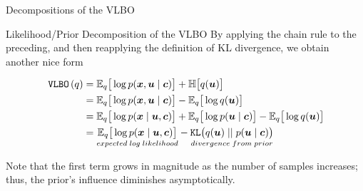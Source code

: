 \documentclass[10pt]{beamer}
\begin{document}
\begin{frame}{Decompositions of the VLBO}
\begin{block}{Likelihood/Prior Decomposition of the VLBO}
By applying the chain rule to the preceding, and then reapplying the definition of KL divergence, we obtain another nice form

 \begin{align*}
\,\texttt{VLBO}\,(q) &=   \mathbb{E}_q \big[ \log p({\boldsymbol x}, {\boldsymbol u} \; | \; {\boldsymbol c}) \big]  +  \mathbb{H} \big[q({\boldsymbol u}) \big] \\
& =  \mathbb{E}_q \big[ \log p({\boldsymbol x}, {\boldsymbol u} \; | \; {\boldsymbol c}) \big] - \mathbb{E}_q \big[ \log q({\boldsymbol u}) \big] \\
& =  \mathbb{E}_q \big[ \log p({\boldsymbol x} \; | \; {\boldsymbol u}, {\boldsymbol c}) \big] + \mathbb{E}_q \big[ \log p({\boldsymbol u} \; | \; {\boldsymbol c}) \big] - \mathbb{E}_q \big[ \log q({\boldsymbol u}) \big] \\
&= \underset{expected \; log \; likelihood}{\mathbb{E}_q \big[ \log p({\boldsymbol x} \; | \; {\boldsymbol u}, {\boldsymbol c}) \big]}  -  \underset{divergence \; from \; prior}{\texttt{KL} \big(q({\boldsymbol u} ) \; || \; p({\boldsymbol u} \; | \; {\boldsymbol c})\big)}
\end{align*}
\end{block} 

 

Note that the first term grows in magnitude as the number of samples increases; thus, the prior's influence diminishes asymptotically.

\end{frame}
\end{document}
